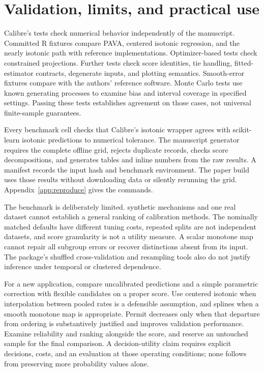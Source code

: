 \documentclass[11pt]{article}
\begin{document}
\section{Validation, limits, and practical use}

Calibre's tests check numerical behavior independently of the manuscript. Committed R fixtures compare PAVA, centered isotonic regression, and the nearly isotonic path with reference implementations. Optimizer-based tests check constrained projections. Further tests check score identities, tie handling, fitted-estimator contracts, degenerate inputs, and plotting semantics. Smooth-error fixtures compare with the authors' reference software. Monte Carlo tests use known generating processes to examine bias and interval coverage in specified settings. Passing these tests establishes agreement on those cases, not universal finite-sample guarantees.

Every benchmark cell checks that Calibre's isotonic wrapper agrees with scikit-learn isotonic predictions to numerical tolerance. The manuscript generator requires the complete offline grid, rejects duplicate records, checks score decompositions, and generates tables and inline numbers from the raw results. A manifest records the input hash and benchmark environment. The paper build uses those results without downloading data or silently rerunning the grid. Appendix~\ref{app:reproduce} gives the commands.

The benchmark is deliberately limited. \BenchSynthetic{} synthetic mechanisms and one real dataset cannot establish a general ranking of calibration methods. The nominally matched defaults have different tuning costs, repeated splits are not independent datasets, and score granularity is not a utility measure. A scalar monotone map cannot repair all subgroup errors or recover distinctions absent from its input. The package's shuffled cross-validation and resampling tools also do not justify inference under temporal or clustered dependence.

For a new application, compare uncalibrated predictions and a simple parametric correction with flexible candidates on a proper score. Use centered isotonic when interpolation between pooled rates is a defensible assumption, and splines when a smooth monotone map is appropriate. Permit decreases only when that departure from ordering is substantively justified and improves validation performance. Examine reliability and ranking alongside the score, and reserve an untouched sample for the final comparison. A decision-utility claim requires explicit decisions, costs, and an evaluation at those operating conditions; none follows from preserving more probability values alone.
\end{document}
